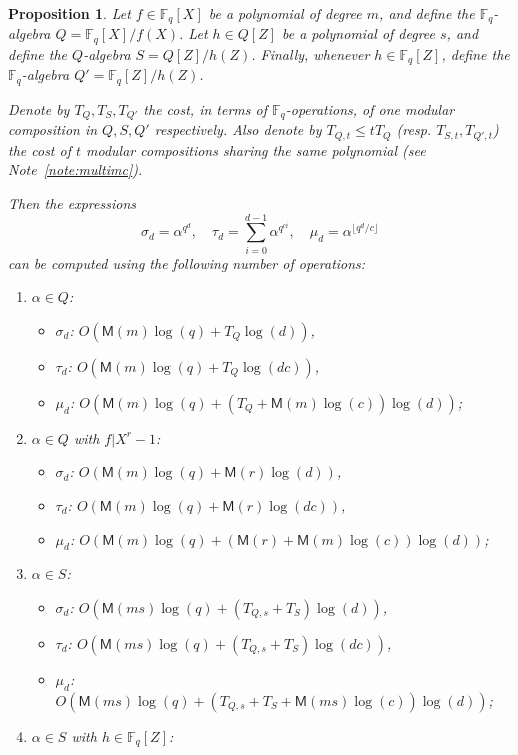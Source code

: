 \documentclass{mcom-l}
\theoremstyle{plain}
\newtheorem{proposition}[theorem]{Proposition}
\theoremstyle{definition}
\newcommand{\F}{\ensuremath{\mathbb{F}}}
\newcommand{\MM}{\ensuremath{\mathsf{M}}}
\begin{document}
\begin{proposition}
\label{prop:trace-like}
Let $f \in \F_q[X]$ be a polynomial of degree $m$,
and define the $\F_q$-algebra $Q = \F_q[X]/f(X)$.
Let $h \in Q[Z]$ be a polynomial of degree $s$,
and define the $Q$-algebra $S =  Q[Z]/h(Z)$.
Finally, whenever $h \in \F_q[Z]$, define
the $\F_q$-algebra $Q' = \F_q[Z]/h(Z)$.

Denote by $T_Q, T_S, T_{Q'}$ the cost, in terms of $\F_q$-operations,
of one modular composition in $Q, S, Q'$ respectively. %
Also denote by $T_{Q,t}\le tT_Q$ (resp. $T_{S,t}, T_{Q',t}$) the cost of $t$
modular compositions sharing the same polynomial (see
Note~\ref{note:multimc}).

Then the expressions
\[
\sigma_d= \alpha^{q^d}, \quad \tau_d = \sum_{i=0}^{d-1} \alpha^{q^{ci}}, \quad
\mu_d=\alpha^{\lfloor q^d/c\rfloor}
\]
can be computed using the following number of operations:
\begin{enumerate}[label=\textbf{Case~\theenumi.},leftmargin=*, align=left]
\item $\alpha \in Q$:
\begin{itemize}
\item
$\sigma_d$: $O(\MM(m) \log(q) + T_Q \log(d))$,
\item
$\tau_d$: $O(\MM(m) \log(q) + T_Q \log(d c))$,
\item
$\mu_d$: $O(\MM(m) \log(q) + (T_Q + \MM(m)\log(c))\log(d))$;
\end{itemize}
\item $\alpha \in Q$ with $f | X^r - 1$:
\begin{itemize}
\item
$\sigma_d$: $O(\MM(m) \log(q) + \MM(r) \log(d))$,
\item
$\tau_d$: $O(\MM(m) \log(q) + \MM(r) \log(d c))$,
\item
$\mu_d$: $O(\MM(m) \log(q) + (\MM(r) + \MM(m)\log(c))\log(d))$;
\end{itemize}
\item $\alpha \in S$:
\begin{itemize}
\item
$\sigma_d$: $O(\MM(ms)\log(q) + (T_{Q,s}+T_S)\log(d))$,
\item
$\tau_d$: $O(\MM(ms)\log(q) + (T_{Q,s}+T_S)\log(d c))$,
\item
$\mu_d$: $ O(\MM(ms)\log(q) + (T_{Q,s}+T_S + \MM(ms)\log(c))\log(d))$;
\end{itemize}
\item $\alpha \in S$ with $h \in \F_q[Z]$:
\begin{itemize}

\end{itemize}
\end{enumerate}
\end{proposition}
\end{document}
